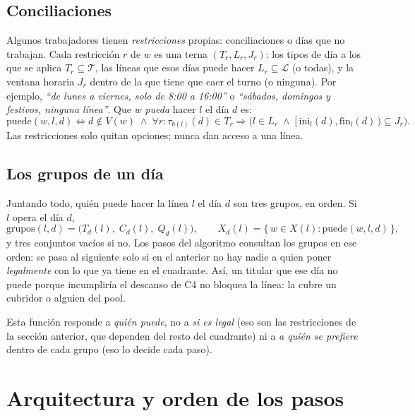 \documentclass[11pt,a4paper]{article}
\newcommand{\Lin}{\mathcal{L}}
\newcommand{\Tipos}{\mathcal{T}}
\begin{document}
\subsection{Conciliaciones}

Algunos trabajadores tienen \emph{restricciones} propias: conciliaciones o días que no trabajan.
Cada restricción $r$ de $w$ es una terna $(T_r, L_r, J_r)$: los tipos de día a los que se aplica
$T_r \subseteq \Tipos$, las líneas que esos días puede hacer $L_r \subseteq \Lin$ (o todas), y la
ventana horaria $J_r$ dentro de la que tiene que caer el turno (o ninguna). Por ejemplo,
\emph{``de lunes a viernes, solo de 8:00 a 16:00''} o \emph{``sábados, domingos y festivos,
ninguna línea''}. Que $w$ \emph{pueda} hacer $l$ el día $d$ es:
\[
  \mathrm{puede}(w,l,d) \iff d \notin V(w) \;\wedge\;
  \forall r : \tau_{b(l)}(d) \in T_r \Rightarrow
  \bigl( l \in L_r \;\wedge\; [\,\mathrm{ini}_l(d), \mathrm{fin}_l(d)\,) \subseteq J_r \bigr).
\]
Las restricciones solo quitan opciones; nunca dan acceso a una línea.

\subsection{Los grupos de un día}

Juntando todo, quién puede hacer la línea $l$ el día $d$ son tres grupos, en orden. Si $l$ opera
el día $d$,
\[
  \mathrm{grupos}(l,d) = \bigl( T_d(l),\; C_d(l),\; Q_d(l) \bigr),
  \qquad
  X_d(l) = \{\, w \in X(l) : \mathrm{puede}(w,l,d) \,\},
\]
y tres conjuntos vacíos si no. Los pasos del algoritmo consultan los
grupos en ese orden: se pasa al siguiente solo si en el anterior no hay nadie a quien poner
\emph{legalmente} con lo que ya tiene en el cuadrante. Así, un titular que ese día no puede
porque incumpliría el descanso de C4 no bloquea la línea: la cubre un cubridor o alguien del
pool.

Esta función responde a \emph{quién puede}, no a \emph{si es legal} (eso son las
restricciones de la sección anterior, que dependen del resto del cuadrante) ni a \emph{a quién
se prefiere} dentro de cada grupo (eso lo decide cada paso).

\section{Arquitectura y orden de los pasos}
\end{document}
